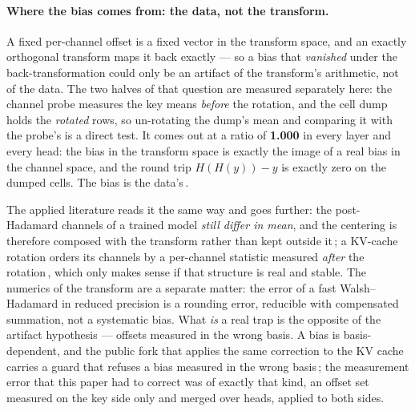 \documentclass[10pt,twocolumn]{article}
\begin{document}
\paragraph{Where the bias comes from: the data, not the transform.} A fixed per-channel offset is a fixed vector in the transform space, and an exactly orthogonal transform maps it back exactly --- so a bias that \emph{vanished} under the back-transformation could only be an artifact of the transform's arithmetic, not of the data. The two halves of that question are measured separately here: the channel probe measures the key means \emph{before} the rotation, and the cell dump holds the \emph{rotated} rows, so un-rotating the dump's mean and comparing it with the probe's is a direct test. It comes out at a ratio of \textbf{1.000} in every layer and every head: the bias in the transform space is exactly the image of a real bias in the channel space, and the round trip $H(H(y)) - y$ is exactly zero on the dumped cells. The bias is the data's\,\cite{strata-bias}.

The applied literature reads it the same way and goes further: the post-Hadamard channels of a trained model \emph{still differ in mean}, and the centering is therefore composed with the transform rather than kept outside it\,\cite{hadanorm}; a KV-cache rotation orders its channels by a per-channel statistic measured \emph{after} the rotation\,\cite{rotatekv}, which only makes sense if that structure is real and stable. The numerics of the transform are a separate matter: the error of a fast Walsh--Hadamard in reduced precision is a rounding error, reducible with compensated summation, not a systematic bias. What \emph{is} a real trap is the opposite of the artifact hypothesis --- offsets measured in the wrong basis. A bias is basis-dependent, and the public fork that applies the same correction to the KV cache carries a guard that refuses a bias measured in the wrong basis\,\cite{llamacpp-center}; the measurement error that this paper had to correct was of exactly that kind, an offset set measured on the key side only and merged over heads, applied to both sides.
\end{document}
